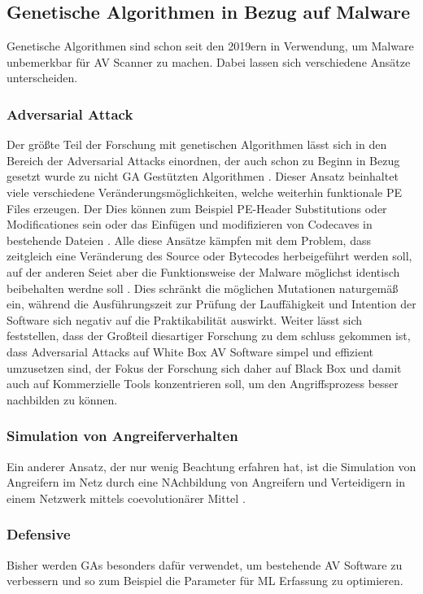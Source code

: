\subsection{Genetische Algorithmen in Bezug auf Malware}
Genetische Algorithmen sind schon seit den 2019ern \cite{castro_2019_aimed} in Verwendung, um Malware unbemerkbar für AV Scanner zu machen. Dabei lassen sich verschiedene Ansätze unterscheiden.
\subsubsection{Adversarial Attack}
Der größte Teil der Forschung mit genetischen Algorithmen lässt sich in den Bereich der Adversarial Attacks einordnen, der auch schon zu Beginn in Bezug gesetzt wurde zu nicht GA Gestützten Algorithmen \cite{castro_2019_armed}. Dieser Ansatz beinhaltet viele verschiedene Veränderungsmöglichkeiten, welche weiterhin funktionale PE Files erzeugen. Der 
Dies können zum Beispiel PE-Header Substitutions oder Modificationes sein\cite{demetrio_2021_adversarial} oder das Einfügen und modifizieren von Codecaves in bestehende Dateien \cite{yuste_2022_optimization}. Alle diese Ansätze kämpfen mit dem Problem, dass zeitgleich eine Veränderung des Source oder Bytecodes herbeigeführt werden soll, auf der anderen Seiet aber die Funktionsweise der Malware möglichst identisch beibehalten werdne soll \cite{demetrio_2021_functionalitypreserving}. Dies schränkt die möglichen Mutationen naturgemäß ein, während die Ausführungszeit zur Prüfung der Lauffähigkeit und Intention der Software sich negativ auf die Praktikabilität auswirkt. 
Weiter lässt sich feststellen, dass der Großteil diesartiger Forschung zu dem schluss gekommen ist, dass Adversarial Attacks auf White Box AV Software simpel und effizient umzusetzen sind, der Fokus der Forschung sich daher auf Black Box und damit auch auf Kommerzielle Tools konzentrieren soll, um den Angriffsprozess besser nachbilden zu können.
\subsubsection{Simulation von Angreiferverhalten}
Ein anderer Ansatz, der nur wenig Beachtung erfahren hat, ist die Simulation von Angreifern im Netz durch eine NAchbildung von Angreifern und Verteidigern in einem Netzwerk mittels coevolutionärer Mittel \cite{alejandro_2024_a}.
\subsubsection{Defensive}
Bisher werden GAs besonders dafür verwendet, um bestehende AV Software zu verbessern und so zum Beispiel die Parameter für ML Erfassung zu optimieren\cite{xie_2023_gastackingmd}.
